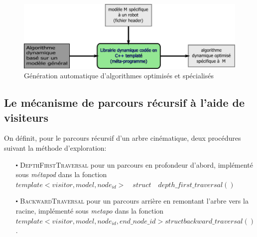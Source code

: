 \documentclass{report}
\begin{document}
\begin{figure}[H]
\centering
\includegraphics[width=\textwidth]{figs/principeAlgoGenerique.pdf}
\caption{Génération automatique d'algorithmes optimisés et spécialisés}
\end{figure}



\subsection{Le mécanisme de parcours récursif à l'aide de visiteurs} \label{ch_concepts_visiteurs}

On définit, pour le parcours récursif d'un arbre cinématique, deux procédures suivant la méthode d'exploration:
\begin{itemize}
\item[$\centerdot$] \textsc{DepthFirstTraversal} pour un parcours en profondeur d'abord, implémenté sous \emph{métapod} dans la fonction $\mathit{template<visitor, model, node_{id}> \quad struct \quad depth\_first\_traversal()}$
\item[$\centerdot$] \textsc{BackwardTraversal} pour un parcours arrière en remontant l'arbre vers la racine, implémenté sous \emph{metapo} dans la fonction $\mathit{template<visitor, model, node_{id}, end\_node\_{id}> struct backward\_traversal()}$.
 \end{itemize}
\bigskip
\end{document}
